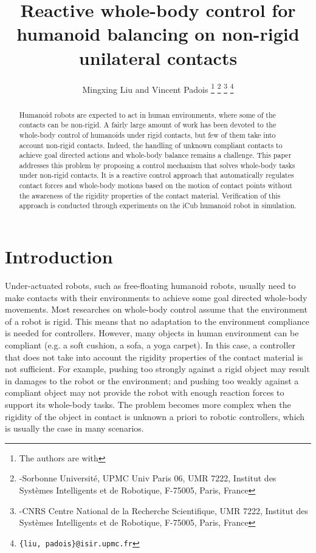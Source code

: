 \documentclass[letterpaper, 10 pt, conference]{ieeeconf}  %
\title{\LARGE \bf
Reactive whole-body control for humanoid balancing on non-rigid unilateral contacts
}
\author{Mingxing Liu and Vincent Padois
\thanks{The authors are with}
\thanks{-Sorbonne Universit\'{e}, UPMC Univ Paris 06, UMR 7222, Institut des Syst\`{e}mes Intelligents et de Robotique, F-75005, Paris, France}
\thanks{-CNRS Centre National de la Recherche Scientifique, UMR 7222, Institut des Syst\`{e}mes Intelligents et de Robotique, F-75005, Paris, France}
\thanks{\tt\small \{liu, padois\}@isir.upmc.fr} }
\begin{document}
\maketitle
\thispagestyle{empty}
\pagestyle{empty}

\begin{abstract}
Humanoid robots are expected to act in human environments, where some of the contacts can be non-rigid. A fairly large amount of work has been devoted to the whole-body control of humanoids under rigid contacts, but few of them take into account non-rigid contacts. Indeed, the handling of unknown compliant contacts to achieve goal directed actions and whole-body balance remains a challenge. This paper addresses this problem by proposing a control mechanism that solves whole-body tasks under non-rigid contacts. It is a reactive control approach that automatically regulates contact forces and whole-body motions based on the motion of contact points without the awareness of the rigidity properties of the contact material. Verification of this approach is conducted through experiments on the iCub humanoid robot in simulation.
\end{abstract}


\section{Introduction}
Under-actuated robots, such as free-floating humanoid robots, usually need to make contacts with their environments to achieve some goal directed whole-body movements.
Most researches on whole-body control assume that the environment of a robot is rigid. This means that no adaptation to the environment compliance is needed for controllers. However, many objects in human environment can be  compliant (e.g. a soft cushion, a sofa, a yoga carpet). In this case, a controller that does not take into account the rigidity properties of the contact material is not sufficient. For example, pushing too strongly against a rigid object may result in damages to the robot or the environment; and pushing too weakly against a compliant object may not provide the robot with enough reaction forces to support its whole-body tasks. The problem becomes more complex when the rigidity of the object in contact is unknown a priori to robotic controllers, which is usually the case in many scenarios.
 
\end{document}
